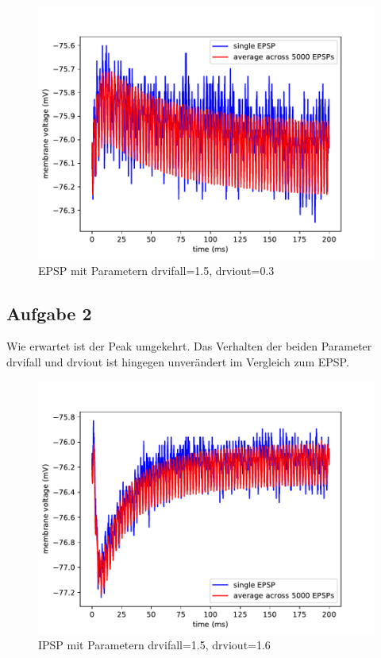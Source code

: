 \documentclass[10pt,a4paper]{scrartcl}
\begin{document}
\begin{figure} [ht]
\begin{center}
\label{fig:abb8}
\caption{EPSP mit Parametern drvifall=1.5, drviout=0.3}
\includegraphics[scale=0.35]{pictures/epsp_fall_1_5_out_0_3.pdf} 
\end{center}
\end{figure}


\subsection{Aufgabe 2}
Wie erwartet ist der Peak umgekehrt. Das Verhalten der beiden Parameter drvifall und drviout ist hingegen unverändert im Vergleich zum EPSP.


\begin{figure} [ht]
\begin{center}
\label{fig:abb9}
\caption{IPSP mit Parametern drvifall=1.5, drviout=1.6}
\includegraphics[scale=0.35]{pictures/epsp_inhibitory_fall_1_5_out_1_6.pdf} 
\end{center}
\end{figure}
\end{document}
